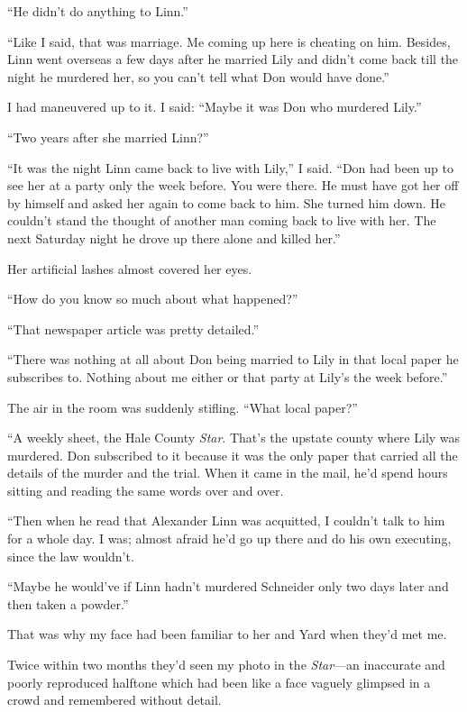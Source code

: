 \documentclass{novel}
\begin{document}
“He didn’t do anything to Linn.”

“Like I said, that was marriage. Me coming up here is cheating on him. Besides, Linn went overseas a few days after he married Lily and didn’t come back till the night he murdered her, so you can’t tell what Don would have done.”

I had maneuvered up to it. I said: “Maybe it was Don who murdered Lily.”

“Two years after she married Linn?”

“It was the night Linn came back to live with Lily,” I said. “Don had been up to see her at a party only the week before. You were there. He must have got her off by himself and asked her again to come back to him. She turned him down. He couldn’t stand the thought of another man coming back to live with her. The next Saturday night he drove up there alone and killed her.”

Her artificial lashes almost covered her eyes.

“How do you know so much about what happened?”

“That newspaper article was pretty detailed.”

“There was nothing at all about Don being married to Lily in that local paper he subscribes to. Nothing about me either or that party at Lily’s the week before.”

The air in the room was suddenly stifling. “What local paper?”

“A weekly sheet, the Hale County \textit{Star}. That’s the upstate county where Lily was murdered. Don subscribed to it because it was the only paper that carried all the details of the murder and the trial. When it came in the mail, he’d spend hours sitting and reading the same words over and over. 

“Then when he read that Alexander Linn was acquitted, I couldn’t talk to him for a whole day. I was; almost afraid he’d go up there and do his own executing, since the law wouldn’t.

“Maybe he would’ve if Linn hadn’t murdered Schneider only two days later and then taken a powder.”

\scenestars

That was why my face had been familiar to her and Yard when they’d met me. 

Twice within two months they’d seen my photo in the \textit{Star}—an inaccurate and poorly reproduced halftone which had been like a face vaguely glimpsed in a crowd and remembered without detail. 
\end{document}
